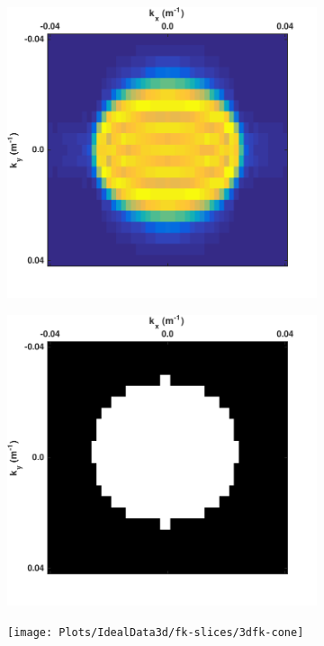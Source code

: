 \begin{figure}
	\centering
	\begin{subfigure}[t]{0.3\textwidth}
		\centering
		\includegraphics[width=\textwidth]{Plots/IdealData3d/P_f_slice40}
		\caption{}
		\label{fig:Ch-Theory-FK-f_slice-data}
	\end{subfigure}
	\centering
	\begin{subfigure}[t]{0.3\textwidth}
		\centering
		\includegraphics[width=\textwidth]{Plots/IdealData3d/fkk-mask-slice40}
		\caption{}
		\label{fig:Ch-Theory-FK-f_slice-mask}
	\end{subfigure}
	\centering
	\begin{subfigure}[t]{0.3\textwidth}
		\centering
		\texttt{[image: Plots/IdealData3d/fk-slices/3dfk-cone]}
		\caption{}
		\label{fig:Ch-Theory-FK-f_slice-data3d}
	\end{subfigure}
	

\end{figure}
